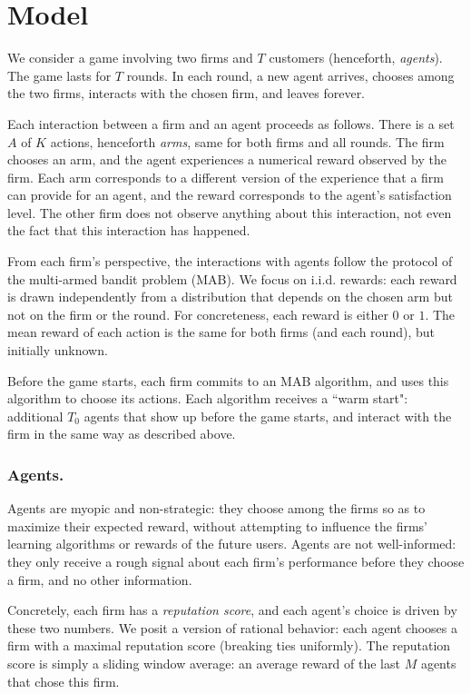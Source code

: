 \documentclass[../competing_bandits.tex]{subfiles}
\begin{document}
\section{Model}\label{sec:model}

We consider a game involving two firms and $T$ customers (henceforth, \emph{agents}). The game lasts for $T$ rounds. In each round, a new agent arrives, chooses among the two firms, interacts with the chosen firm, and leaves forever. 

Each interaction between a firm and an agent proceeds as follows. There is a set $A$ of $K$ actions, henceforth \emph{arms}, same for both firms and all rounds. The firm chooses an arm, and the agent experiences a numerical reward observed by the firm. Each arm corresponds to a different version of the experience that a firm can provide for an agent, and the reward corresponds to the agent's satisfaction level. The other firm does not observe anything about this interaction, not even the fact that this interaction has happened.

From each firm's perspective, the interactions with agents follow the protocol of the multi-armed bandit problem (MAB). We focus on i.i.d. rewards: each reward is drawn independently from a distribution that depends on the chosen arm but not on the firm or the round. For concreteness, each reward is either $0$ or $1$. The mean reward of each action is the same for both firms (and each round), but initially unknown.  

Before the game starts, each firm commits to an MAB algorithm, and uses this algorithm to choose its actions. Each algorithm receives a ``warm start": additional $T_0$ agents that show up before the game starts, and interact with the firm in the same way as described above.

\subsubsection{Agents.}
Agents are myopic and non-strategic: they choose among the firms so as to maximize their expected reward, without attempting to influence the firms' learning algorithms or rewards of the future users. Agents are not well-informed: they only receive a rough signal about each firm's performance before they choose a firm, and no other information.

Concretely, each firm has a \emph{reputation score}, and each agent's choice is driven by these two numbers. We posit a version of rational behavior: each agent chooses a firm with a maximal reputation score (breaking ties uniformly). The reputation score is simply a sliding window average: an average reward of the last $M$ agents that chose this firm.
\end{document}
